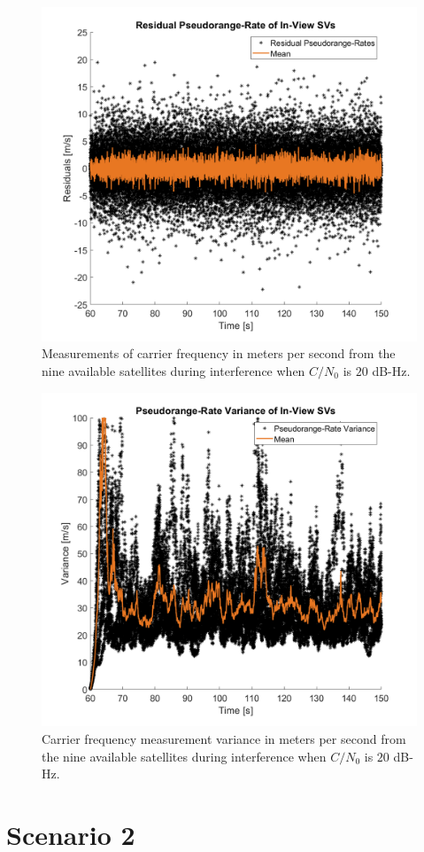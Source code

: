 \begin{figure}[!ht]
    \centering
    \includegraphics[width=0.75\linewidth]{Figures/Results/Scenario1/Case20/carrierFreq.png}
    \caption{Measurements of carrier frequency in meters per second from the nine available satellites during interference when \(C/N_0\) is \(20\) dB-Hz.}\label{fig:carrier20}
\end{figure}

\begin{figure}[!ht]
    \centering
    \includegraphics[width=0.75\linewidth]{Figures/Results/Scenario1/Case20/carrierVariance.png}
    \caption{Carrier frequency measurement variance in meters per second from the nine available satellites during interference when \(C/N_0\) is \(20\) dB-Hz.}\label{fig:carrierVariance20}
\end{figure}

\section{\textbf{Scenario 2}}

